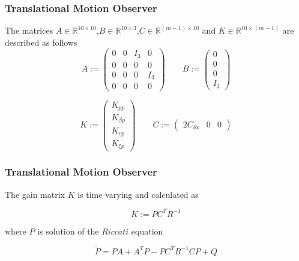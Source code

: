 \documentclass{beamer}
\begin{document}
	\begin{frame}
		\frametitle{Translational Motion Observer}
		The matrices $A \in \mathbb{R}^{10\times 10}$,$B \in \mathbb{R}^{10\times 3}$,$C \in \mathds{R}^{(m-1) \times 10} $ and $K \in \mathds{R}^{10 \times (m-1)}$ are described as follows
		$$
		A :=
		\begin{pmatrix}
		0 & 0 & I_3 & 0 \\ 
		0 & 0 & 0 & 0 \\
		0 & 0 & 0 & I_3 \\
		0 & 0 & 0 & 0
		\end{pmatrix}
		\qquad
		B := 
		\begin{pmatrix}
		0 \\ 0 \\ 0 \\ I_3
		\end{pmatrix}
		$$
		
		$$
		K := 
		\begin{pmatrix}
		K_{pp} \\ K_{\beta p} \\ K_{vp} \\ K_{\xi p}
		\end{pmatrix}
		\qquad
		C :=
		\begin{pmatrix}
		2C_{\delta x} & 0 & 0
		\end{pmatrix}
		$$
	\end{frame}
	\begin{frame}
		\frametitle{Translational Motion Observer}
		The gain matrix $K$ is time varying and calculated as
		
		\[ K := PC^TR^{-1} \]
		
		 where $P$ is solution of the $Riccati$ equation
		
		\[ \dot{P} = PA + A^TP - PC^TR^{-1}CP + Q\]
	\end{frame}



	
\end{document}
